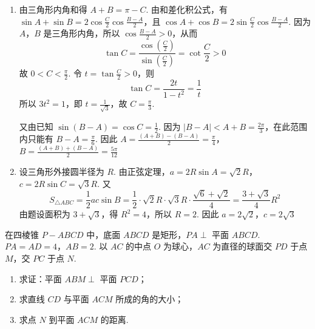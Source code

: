 \begin{solution}
\begin{enumerate}
\item
由三角形内角和得 \(A+B=\pi-C\). 由和差化积公式，有
\(\sin A+\sin B=2\cos\frac{C}{2}\cos\frac{B-A}{2}\)，且
\(\cos A+\cos B=2\sin\frac{C}{2}\cos\frac{B-A}{2}\).
因为 \(A\)，\(B\) 是三角形内角，所以 \(\cos\frac{B-A}{2}>0\)，从而
\[
\tan C=\frac{\cos(\frac{C}{2})}{\sin(\frac{C}{2})}=\cot\frac{C}{2}>0
\]
故 \(0<C<\frac\pi2\). 令 \(t=\tan\frac{C}{2}>0\)，则
\[
\tan C=\frac{2t}{1-t^{2}}=\frac1t
\]
所以 \(3t^{2}=1\)，即 \(t=\frac1{\sqrt3}\)，故 \(C=\frac\pi3\).

又由已知 \(\sin(B-A)=\cos C=\frac12\). 因为 \(\lvert B-A\rvert<A+B=\frac{2\pi}{3}\)，在此范围内只能有 \(B-A=\frac\pi6\). 因此
\(A=\frac{(A+B)-(B-A)}2=\frac\pi4\)，\(B=\frac{(A+B)+(B-A)}2=\frac{5\pi}{12}\)

\item
设三角形外接圆半径为 \(R\). 由正弦定理，\(a=2R\sin A=\sqrt2R\)，\(c=2R\sin C=\sqrt3R\).
又
\[
S_{\triangle ABC}=\frac12ac\sin B
=\frac12\cdot\sqrt2R\cdot\sqrt3R\cdot\frac{\sqrt6+\sqrt2}{4}
=\frac{3+\sqrt3}{4}R^{2}
\]
由题设面积为 \(3+\sqrt3\)，得 \(R^{2}=4\)，所以 \(R=2\). 因此
\(a=2\sqrt2\)，\(c=2\sqrt3\)
\end{enumerate}
\end{solution}

\begin{problem}
在四棱锥 \(P - ABCD\) 中，底面 \(ABCD\) 是矩形，\(PA \perp\) 平面 \(ABCD\). \(PA = AD = 4\)，\(AB = 2\). 以 \(AC\) 的中点 \(O\) 为球心，\(AC\) 为直径的球面交 \(PD\) 于点 \(M\)，交 \(PC\) 于点 \(N\).

\begin{enumerate}
\item 求证：平面 \(ABM \perp\) 平面 \(PCD\)；
\item 求直线 \(CD\) 与平面 \(ACM\) 所成的角的大小；
\item 求点 \(N\) 到平面 \(ACM\) 的距离.
\end{enumerate}

\end{problem}


